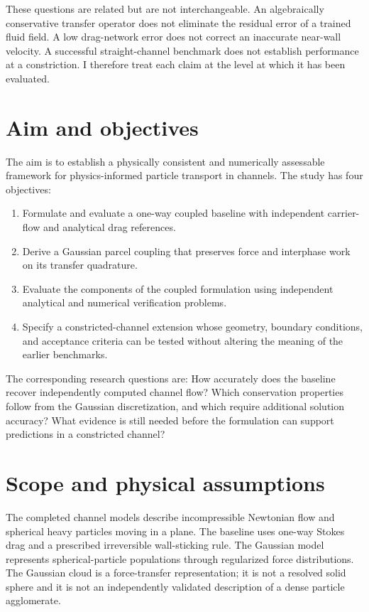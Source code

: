 These questions are related but are not interchangeable. An algebraically
conservative transfer operator does not eliminate the residual error of a
trained fluid field. A low drag-network error does not correct an inaccurate
near-wall velocity. A successful straight-channel benchmark does not
establish performance at a constriction. I therefore treat each claim at
the level at which it has been evaluated.

\section{Aim and objectives}
The aim is to establish a physically consistent and numerically assessable
framework for physics-informed particle transport in channels. The study
has four objectives:
\begin{enumerate}
\item Formulate and evaluate a one-way coupled baseline with independent
carrier-flow and analytical drag references.
\item Derive a Gaussian parcel coupling that preserves force and interphase
work on its transfer quadrature.
\item Evaluate the components of the coupled formulation using independent
analytical and numerical verification problems.
\item Specify a constricted-channel extension whose geometry, boundary
conditions, and acceptance criteria can be tested without altering the
meaning of the earlier benchmarks.
\end{enumerate}

The corresponding research questions are: How accurately does the baseline
recover independently computed channel flow? Which conservation properties
follow from the Gaussian discretization, and which require additional
solution accuracy? What evidence is still needed before the formulation
can support predictions in a constricted channel?

\section{Scope and physical assumptions}
The completed channel models describe incompressible Newtonian flow and
spherical heavy particles moving in a plane. The baseline uses one-way
Stokes drag and a prescribed irreversible wall-sticking rule. The Gaussian
model represents spherical-particle populations through regularized force
distributions. The Gaussian cloud is a force-transfer representation; it
is not a resolved solid sphere and it is not an independently validated
description of a dense particle agglomerate.

